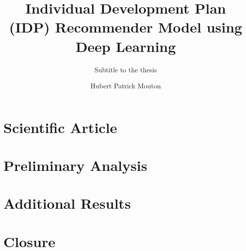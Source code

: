 \documentclass{layout/tudelft-report}
\begin{document}
    \frontmatter

    \title{ Individual Development Plan (IDP) Recommender Model using Deep Learning}
    \subtitle{Subtitle to the thesis}
    \author{Hubert Patrick Mouton}
    \subject{Thesis Report}

    \makecover
    \afterpage{\blankpage}
    
    
    

    
    
    \tableofcontents    
    \printnomenclature
    \listoffigures
    \listoftables

    \mainmatter
    
    

    \epigraphhead[650]{}
    \part{Scientific Article}
    \label{part:article}



    
    \newpage

    \part{Preliminary Analysis}
    \label{part:prelim}
    
    
    

    \epigraphhead[650]{}
    \part{Additional Results}
    \label{part:additional}
    
    
    

    \epigraphhead[650]{}
    \part{Closure}
    \label{part:closure}

    
    

    \printbibliography[title=References]
    
    \appendix
    
    
\end{document}
